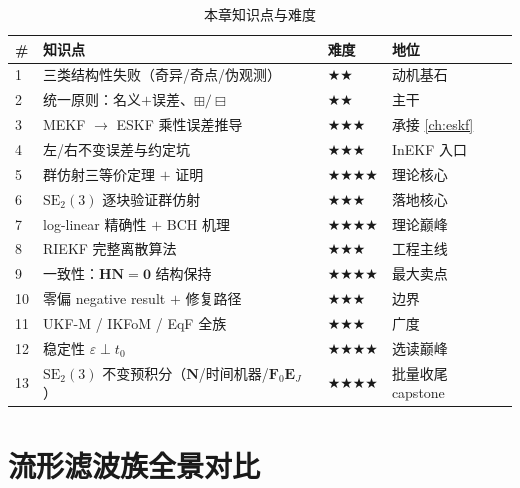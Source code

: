 \begin{table}[H]\centering\small
\caption{本章知识点与难度}
\begin{tabular}{llll}
\toprule
\# & 知识点 & 难度 & 地位 \\
\midrule
1 & 三类结构性失败（奇异/奇点/伪观测） & $\bigstar\bigstar$ & 动机基石 \\
2 & 统一原则：名义$+$误差、$\boxplus/\boxminus$ & $\bigstar\bigstar$ & 主干 \\
3 & MEKF $\to$ ESKF 乘性误差推导 & $\bigstar\bigstar\bigstar$ & 承接 \cref{ch:eskf} \\
4 & 左/右不变误差与约定坑 & $\bigstar\bigstar\bigstar$ & InEKF 入口 \\
5 & 群仿射三等价定理 $+$ 证明 & $\bigstar\bigstar\bigstar\bigstar$ & 理论核心 \\
6 & $\mathrm{SE}_2(3)$ 逐块验证群仿射 & $\bigstar\bigstar\bigstar$ & 落地核心 \\
7 & log-linear 精确性 $+$ BCH 机理 & $\bigstar\bigstar\bigstar\bigstar$ & 理论巅峰 \\
8 & RIEKF 完整离散算法 & $\bigstar\bigstar\bigstar$ & 工程主线 \\
9 & 一致性：$\mathbf{H}\mathbf{N}=\mathbf{0}$ 结构保持 & $\bigstar\bigstar\bigstar\bigstar$ & 最大卖点 \\
10 & 零偏 negative result $+$ 修复路径 & $\bigstar\bigstar\bigstar$ & 边界 \\
11 & UKF-M / IKFoM / EqF 全族 & $\bigstar\bigstar\bigstar$ & 广度 \\
12 & 稳定性 $\varepsilon\perp t_0$ & $\bigstar\bigstar\bigstar\bigstar$ & 选读巅峰 \\
13 & $\mathrm{SE}_2(3)$ 不变预积分（$\mathbf{N}$/时间机器/$\mathbf{F}_0\mathbf{E}_J$） & $\bigstar\bigstar\bigstar\bigstar$ & 批量收尾 capstone \\
\bottomrule
\end{tabular}
\end{table}

\section*{流形滤波族全景对比}

